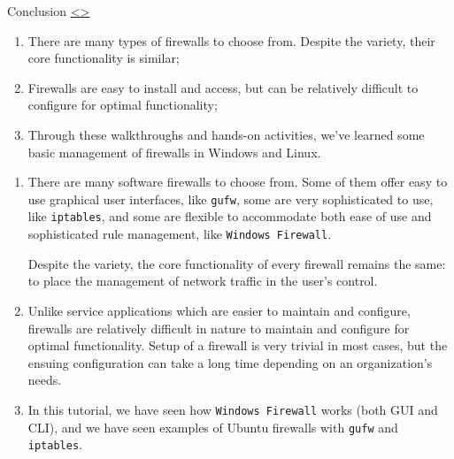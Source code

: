 \documentclass[12pt]{extarticle}
\newenvironment{instructionblock}{\Large\bgroup}{\egroup}
\begin{document}
\pagebreak
\begin{slide}{ Conclusion }{ \hyperref[slide 25]{\textless}\hyperref[slide 27]{\textgreater} }
	\begin{instructionblock}
		\begin{enumerate}
			\item There are many types of firewalls to choose from. Despite the variety, their core functionality is similar;
			\item Firewalls are easy to install and access, but can be relatively difficult to configure for optimal functionality;
			\item Through these walkthroughs and hands-on activities, we've learned some basic management of firewalls in Windows and Linux.
		\end{enumerate}
	\end{instructionblock}
\end{slide}


\vspace{8mm}
\begin{enumerate}
\item { There are many software firewalls to choose from. Some of them offer easy to use graphical user interfaces, like \texttt{gufw}, some are very sophisticated to use, like \texttt{iptables}, and some are flexible to accommodate both ease of use and sophisticated rule management, like \texttt{Windows Firewall}. 

Despite the variety, the core functionality of every firewall remains the same: to place the management of network traffic in the user's control. }
\item { Unlike service applications which are easier to maintain and configure, firewalls are relatively difficult in nature to maintain and configure for optimal functionality. Setup of a firewall is very trivial in most cases, but the ensuing configuration can take a long time depending on an organization's needs. }
\item { In this tutorial, we have seen how \texttt{Windows Firewall} works (both GUI and CLI), and we have seen examples of Ubuntu firewalls with \texttt{gufw} and \texttt{iptables}. }

\end{enumerate}


\end{document}
